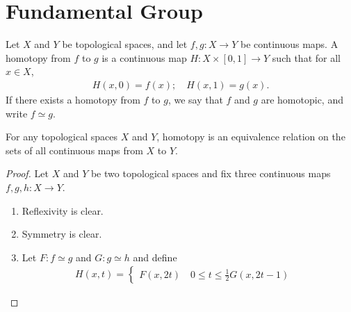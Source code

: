 \chapter{Fundamental Group}

\begin{defbox}
    \begin{definition}
        Let \(X\) and \(Y\) be topological spaces, and let \(f, g: X \longrightarrow Y\) be continuous maps. A homotopy from \(f\) to \(g\) is a continuous map \(H: X \times [0, 1] \longrightarrow Y\) such that for all \(x \in X\),
        \begin{align*}
            H(x, 0) = f(x); \quad H(x, 1) = g(x) \text{.}
        \end{align*}
        If there exists a homotopy from \(f\) to \(g\), we say that \(f\) and \(g\) are homotopic, and write \(f \simeq g\).
    \end{definition}
\end{defbox}

\begin{thmbox}
    \begin{proposition}
        For any topological spaces \(X\) and \(Y\), homotopy is an equivalence relation on the sets of all continuous maps from \(X\) to \(Y\).
    \end{proposition}
\end{thmbox}

\begin{proof}
    Let \(X\) and \(Y\) be two topological spaces and fix three continuous maps \(f, g, h: X \longrightarrow Y\).
    \begin{enumerate}
        \item Reflexivity is clear.
        \item Symmetry is clear.
        \item Let \(F: f \simeq g\) and \(G: g \simeq h\) and define
        \begin{align*}
            H(x, t) = \begin{cases}
                F(x, 2t) \quad 0 \leq t \leq \frac{1}{2}
                G(x, 2t-1) \quad 
            \end{cases}
        \end{align*}
    \end{enumerate}
\end{proof}